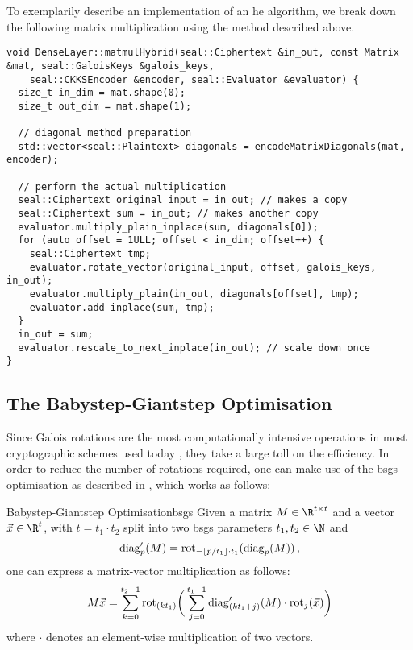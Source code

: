 To exemplarily describe an implementation of an \gls{he} algorithm, we break down the following matrix multiplication using the method described above.
\begin{verbatim}
void DenseLayer::matmulHybrid(seal::Ciphertext &in_out, const Matrix &mat, seal::GaloisKeys &galois_keys,
    seal::CKKSEncoder &encoder, seal::Evaluator &evaluator) {
  size_t in_dim = mat.shape(0);
  size_t out_dim = mat.shape(1);

  // diagonal method preparation
  std::vector<seal::Plaintext> diagonals = encodeMatrixDiagonals(mat, encoder);

  // perform the actual multiplication
  seal::Ciphertext original_input = in_out; // makes a copy
  seal::Ciphertext sum = in_out; // makes another copy
  evaluator.multiply_plain_inplace(sum, diagonals[0]);
  for (auto offset = 1ULL; offset < in_dim; offset++) {
    seal::Ciphertext tmp;
    evaluator.rotate_vector(original_input, offset, galois_keys, in_out);
    evaluator.multiply_plain(in_out, diagonals[offset], tmp);
    evaluator.add_inplace(sum, tmp);
  }
  in_out = sum;
  evaluator.rescale_to_next_inplace(in_out); // scale down once
}
\end{verbatim}

\subsection{The Babystep-Giantstep Optimisation}
Since Galois rotations are the most computationally intensive operations in most cryptographic schemes used today \parencite{2021-pasta}, they take a large toll on the efficiency.
In order to reduce the number of rotations required, one can make use of the \gls{bsgs} optimisation as described in \cite{2018-faster-helib}, which works as follows:

\begin{theorem}{Babystep-Giantstep Optimisation}{bsgs}
  Given a matrix $M \in \R^{t \times t}$ and a vector $\vec{x} \in \R^t$, with $t = t_1 \cdot t_2$ split into two \gls{bsgs} parameters $t_1, t_2 \in \N$ and
  $$\mathrm{diag}'_p(M) = \mathrm{rot}_{-\lfloor p/t_1 \rfloor \cdot t_1}(\mathrm{diag}_p(M))\,,$$
  one can express a matrix-vector multiplication as follows:
  \begin{equation*}
    M \vec{x} = \sum_{k=0}^{t_2-1} \mathrm{rot}_{(kt_1)} \bigg(
    \sum_{j=0}^{t_1-1} \mathrm{diag}'_{(kt_1+j)}(M) \cdot \mathrm{rot}_j(\vec{x})
    \bigg)
  \end{equation*}
  where $\cdot$ denotes an element-wise multiplication of two vectors.
\end{theorem}

